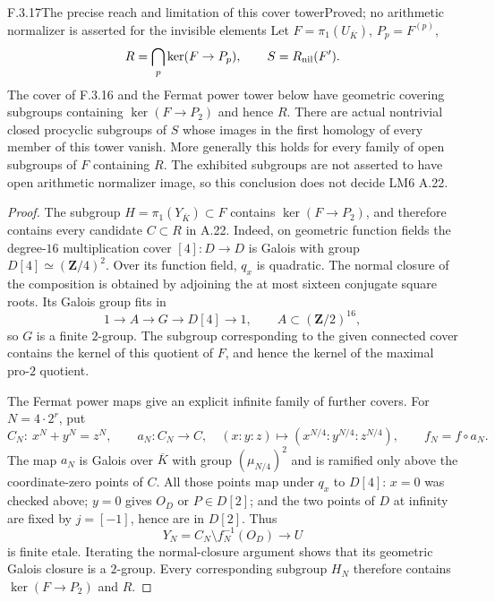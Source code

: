 \begin{result}{F.3.17}{The precise reach and limitation of this cover tower}{Proved; no arithmetic normalizer is asserted for the invisible elements}
Let $F=\pi_1(U_{\overline K})$, $P_p=F^{(p)}$,
\[
 R=\bigcap_p\ker(F\to P_p),\qquad S=R_{\rm nil}(F').
\]
The cover of F.3.16 and the Fermat power tower below have geometric covering subgroups containing $\ker(F\to P_2)$ and hence $R$. There are actual nontrivial closed procyclic subgroups of $S$ whose images in the first homology of every member of this tower vanish. More generally this holds for every family of open subgroups of $F$ containing $R$. The exhibited subgroups are not asserted to have open arithmetic normalizer image, so this conclusion does not decide LM6 A.22.
\end{result}
\begin{proof}
The subgroup $H=\pi_1(Y_{\overline K})\subset F$ contains $\ker(F\to P_2)$, and therefore contains every candidate $C\subset R$ in A.22. Indeed, on geometric function fields the degree-$16$ multiplication cover $[4]:D\to D$ is Galois with group $D[4]\simeq(\mathbf Z/4)^2$. Over its function field, $q_x$ is quadratic. The normal closure of the composition is obtained by adjoining the at most sixteen conjugate square roots. Its Galois group fits in
\[
 1\longrightarrow A\longrightarrow G\longrightarrow D[4]\longrightarrow1,
 \qquad A\subset(\mathbf Z/2)^{16},
\]
so $G$ is a finite $2$-group. The subgroup corresponding to the given connected cover contains the kernel of this quotient of $F$, and hence the kernel of the maximal pro-$2$ quotient.

The Fermat power maps give an explicit infinite family of further covers. For $N=4\cdot2^r$, put
\[
 C_N:\ x^N+y^N=z^N,\qquad
 a_N:C_N\to C,\quad(x:y:z)\mapsto(x^{N/4}:y^{N/4}:z^{N/4}),
 \qquad f_N=f\circ a_N.
\]
The map $a_N$ is Galois over $\overline K$ with group $(\mu_{N/4})^2$ and is ramified only above the coordinate-zero points of $C$. All those points map under $q_x$ to $D[4]$: $x=0$ was checked above; $y=0$ gives $O_D$ or $P\in D[2]$; and the two points of $D$ at infinity are fixed by $j=[-1]$, hence are in $D[2]$. Thus
\[
 Y_N=C_N\setminus f_N^{-1}(O_D)\longrightarrow U
\]
is finite etale. Iterating the normal-closure argument shows that its geometric Galois closure is a $2$-group. Every corresponding subgroup $H_N$ therefore contains $\ker(F\to P_2)$ and $R$.


\end{proof}
